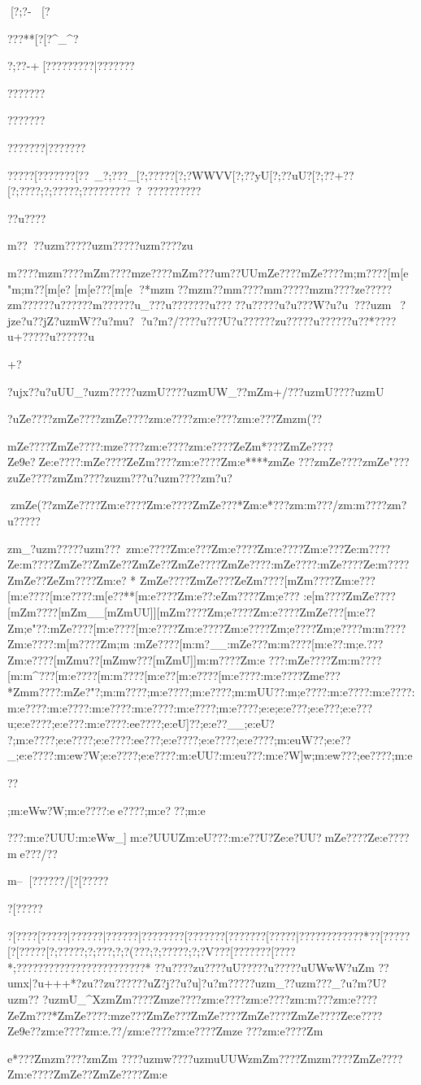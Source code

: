 [?;?-	[?{???**[?[?^_^?{?;??-+[?????????|???????{???????{???????{???????|???????{?????[???????[??~_{?;???_[?;?????[?;?WWVV[?;??}yU[?;??uU?[?;??+??[?;????;?;?????;?????????~?~??????????



??u????}{m??~??uzm?????uzm?????uzm????zu{m????{mzm????{mZm????{mze????{mZm???{u{m??UU{mZe????{mZe????{m;m????[m[e
 " {m;m??[m[e?   [m[e?? ?[m[e ?*{mzm ??{mzm   ??m{m????m{m?????mzm????}ze?????zm??????u?????}?m?????}?u_???u?}?????}?u????}?u?????u?u???W?u?u???uzm~?jze?u??jZ?uzmW??u?mu?
?u?m?/???}?u???U?u?}?????}zu?????u?}?????u?}?*???}?u+????}?u?????}?u

+?}?ujx??u?uUU_?uzm?????uzmU????uzmUW_??mZm+/???uzmU????uzmU}?uZe????zmZe????zmZe????zm:e????zm:e????zm:e???Zmzm(?? {mZe????ZmZe????:mze????zm:e????zm:e????ZeZm*???ZmZe????Ze9e?  Ze:e????:mZe????ZeZm????zm:e????Zm:e****zmZe
???zmZe????zmZe"???zuZe????zmZm????zuzm???u?uzm????zm?u?

zmZe (??zmZe????Zm:e????Zm:e????ZmZe???*Zm:e*???zm:m???/zm:m????zm?u?????}zm_?uzm?????uzm???~zm:e????Zm:e???Zm:e????Zm:e????Zm:e???Ze:m????Ze:m????ZmZe??ZmZe??ZmZe??ZmZe????ZmZe????:mZe????:mZe????Ze:m????ZmZe??ZeZm????Zm:e?
*
ZmZe????ZmZe???ZeZm????[mZm????Zm:e???[m:e????[m:e????:m[e??**[m:e????Zm:e??:eZm????Zm;e???
:e[m????ZmZe????[mZm????[mZm__[mZmUU]][mZm????Zm;e????Zm:e????ZmZe???[m:e??Zm;e"? ?:mZe????[m:e????[m:e????Zm:e????Zm:e????Zm;e????Zm;e????{m:m????Zm:e????:m[m????Zm;m 
:mZe????[m:m?__:mZe???{m:m????[m:e??:m;e.???Zm:e????[mZmu??[mZmw???[mZmU]]{m:m????Zm:e
???:mZe????Zm:m????[m:m^???[m:e????[m:m????[m:e??[m:e????[m:e????:m:e????Zme???*Zmm????:mZe?"?;m:m????;m:e????;m:e????;m:mUU??:m;e????:m:e????:m:e????:m:e????:m:e????:m:e????:m:e????:m:e????;m:e????;e:e};e:e???;e:e??}?;e:e???u;e:e????;e:e???:m:e????:ee????;e:eU]??;e:e??__;e:eU??;m:e????;e:e????;e:e????:ee???;e:e????;e:e????;e:e????;m:euW??;e:e??_;e:e????:m:ew?W;e:e????;e:e????:m:eUU?}:m:eu???:m:e?W]w;m:ew???;ee????;m:e}??};m:eWw?W;m:e????:ee????;m:e???;m:e}???:m:e?UUU:m:eWw_]m:e?UUUZm:eU???:m:e??U?Ze:e?UU?mZe????Ze:e????me???/??{m--[??????/[?[?????{?[?????{?[??? {?[?????|?{?????|?{?????|?{???????[???????[???????[?????|?{?????{??????*??[?????[?[?????[?;?????;?;?  ??;?;?(???;?;?????;?;?V???[???????[????*;????????????????????????*
 ??u ????}zu??  ?}?uU????}?u????}?uUWwW?uZm
  ??u{mx|\W{m[m ???{m[m????{mZm????{mZm???{mZm
???{mZm????{m:m????{m;m/??
[m{m??i?{m:m????[m[e? 
[m:m???[mZe??"??m{m?????mzm???mzm?????mzm?????uze???
??m??????}??????u???????u??????u?????}?}???}?u???}?u?W^z?u?m????uzm?????u?m?????}?m?????uzm?????m?u????zu?m?????u?m?????u?m
??u?u?????}?u?????}?u?????}?u_U?}?u?????}?u+++*?}zu?  ?}zu?????}?uZ?j??u?u]?u?m?????uzm_??uzm???_?u?m?U?uzm?? 
?uzmU_^XzmZm????Zmze????zm:e????zm:e????zm:m???zm:e????ZeZm???*ZmZe????:mze???ZmZe???ZmZe????ZmZe????ZmZe????Ze:e????Ze9e??zm:e????zm:e.??/zm:e????zm:e????Zmze
???zm:e????Zm{e*???Zmzm????zmZm
????uzmw????uzmuUUWzmZm????Zmzm????ZmZe????Zm:e????ZmZe??ZmZe????Zm:e

}}}}}}
